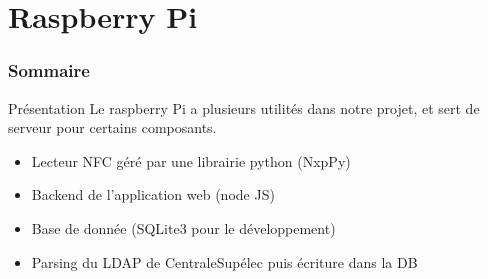 \documentclass[aspectratio=169]{beamer}
\begin{document}
\section{Raspberry Pi}

\begin{frame}
    \frametitle{Sommaire}
    \tableofcontents[
      currentsection,
      sectionstyle=show/shaded,
      subsectionstyle=show/shaded/hide
    ]
\end{frame}

\begin{frame}{Présentation}
  Le raspberry Pi a plusieurs utilités dans notre projet, et sert de serveur pour certains composants.
  \begin{itemize}
    \item Lecteur NFC géré par une librairie python (NxpPy)
    \item Backend de l'application web (node JS)
    \item Base de donnée (SQLite3 pour le développement)
    \item Parsing du LDAP de CentraleSupélec puis écriture dans la DB
  \end{itemize}


\end{frame}
\end{document}
